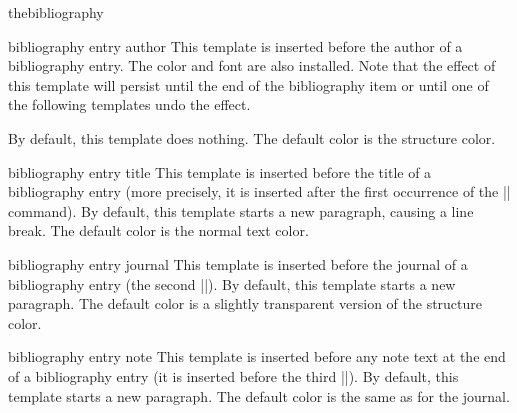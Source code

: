 \begin{environment}{{thebibliography}}
  \begin{element}{bibliography entry author}\yes\yes\yes
    This template is inserted before the author of a bibliography
    entry. The color and font are also installed. Note that the effect
    of this template will persist until the end of the bibliography
    item or until one of the following templates undo the effect.

    By default, this template does nothing. The default color is the
    structure color.
  \end{element}

  \begin{element}{bibliography entry title}\yes\yes\yes
    This template is inserted before the title of a bibliography
    entry (more precisely, it is inserted after the first occurrence of
    the |\newblock| command). By default, this template starts a new
    paragraph, causing a line break. The default color is the normal
    text color.
  \end{element}

  \begin{element}{bibliography entry journal}\yes\yes\yes
    This template is inserted before the journal of a bibliography
    entry (the second |\newblock|). By default, this template starts a
    new paragraph. The default color is a slightly transparent version
    of the structure color.
  \end{element}


  \begin{element}{bibliography entry note}\yes\yes\yes
    This template is inserted before any note text at the end of a
    bibliography entry (it is inserted before the third
    |\newblock|). By default, this template starts a new
    paragraph. The default color is the same as for the journal.
  \end{element}
\end{environment}


